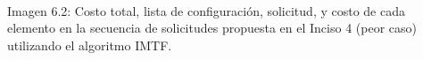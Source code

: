 \begin{center}
\\
\vspace{0.02in}
\small\textcolor{FSBlue}{Imagen 6.2: Costo total, lista de configuración, solicitud, y costo de cada elemento en la secuencia de solicitudes propuesta en el Inciso 4 (peor caso) utilizando el algoritmo IMTF.}
\end{center}

